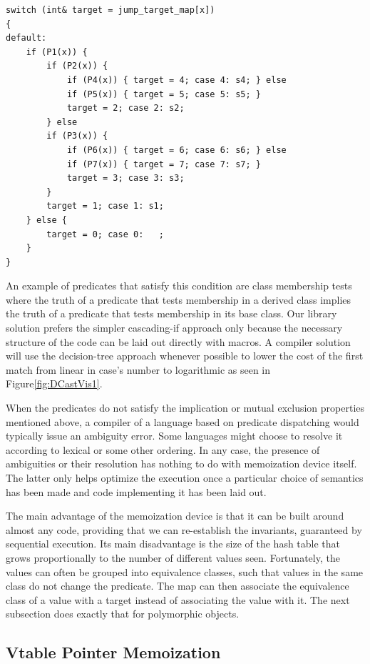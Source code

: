 \documentclass[preprint]{sigplanconf}
\begin{document}
\begin{lstlisting}
switch (int& target = jump_target_map[x])
{
default:
    if (P1(x)) {
        if (P2(x)) {
            if (P4(x)) { target = 4; case 4: s4; } else
            if (P5(x)) { target = 5; case 5: s5; } 
            target = 2; case 2: s2;
        } else
        if (P3(x)) {
            if (P6(x)) { target = 6; case 6: s6; } else
            if (P7(x)) { target = 7; case 7: s7; } 
            target = 3; case 3: s3;
        }
        target = 1; case 1: s1;
    } else {
        target = 0; case 0:   ;
    }
}
\end{lstlisting}

\noindent
An example of predicates that satisfy this condition are class membership tests
where the truth of a predicate that tests membership in a derived class implies 
the truth of a predicate that tests membership in its base class. Our library 
solution prefers the simpler cascading-if approach only because the necessary 
structure of the code can be laid out directly with macros. A compiler solution 
will use the decision-tree approach whenever possible to lower the cost of the 
first match from linear in case's number to logarithmic as seen in Figure\ref{fig:DCastVis1}.

When the predicates do not satisfy the implication or mutual exclusion properties 
mentioned above, a compiler of a language based on predicate dispatching would 
typically issue an ambiguity error. Some languages might choose to resolve it 
according to lexical or some other ordering. In any case, the presence of 
ambiguities or their resolution has nothing to do with memoization device 
itself. The latter only helps optimize the execution once a particular choice of 
semantics has been made and code implementing it has been laid out.

The main advantage of the memoization device is that it can be built around 
almost any code, providing that we can re-establish the invariants, guaranteed 
by sequential execution. Its main disadvantage is the size of the hash table 
that grows proportionally to the number of different values seen. Fortunately, 
the values can often be grouped into equivalence classes, such that values in 
the same class do not change the predicate. The map can then associate the 
equivalence class of a value with a target instead of associating the value with 
it. The next subsection does exactly that for polymorphic objects.

\subsection{Vtable Pointer Memoization}
\label{sec:vtblmem}
\end{document}

